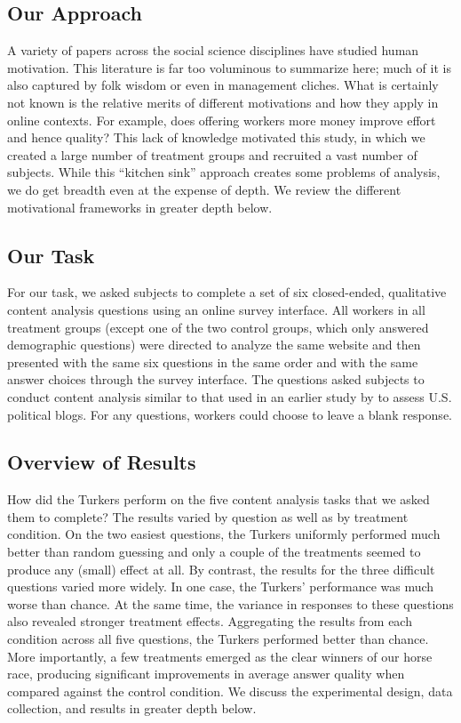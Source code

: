 \documentclass{chi2009}
\begin{document}
\subsection{Our Approach} 
A variety of papers across the social science disciplines have studied
human motivation. This literature is far too voluminous to summarize
here; much of it is also captured by folk wisdom or even in management
cliches. What is certainly not known is the relative merits of
different motivations and how they apply in online contexts. For
example, does offering workers more money improve effort and hence
quality? This lack of knowledge motivated this study, in which we
created a large number of treatment groups and recruited a vast number
of subjects. While this ``kitchen sink'' approach creates some
problems of analysis, we do get breadth even at the expense of
depth. We review the different motivational frameworks in greater
depth below.

\subsection{Our Task} 
For our task, we asked subjects to complete a set of six closed-ended,
qualitative content analysis questions using an online survey
interface. All workers in all treatment groups (except one of the two
control groups, which only answered demographic questions) were
directed to analyze the same website and then presented with the same
six questions in the same order and with the same answer choices
through the survey interface. The questions asked subjects to conduct
content analysis similar to that used in an earlier study by
\cite{benklershaw2010} to assess U.S. political blogs. For any
questions, workers could choose to leave a blank response.


\subsection{Overview of Results} 
How did the Turkers perform on the five content analysis tasks that we
asked them to complete? The results varied by question as well as by
treatment condition. On the two easiest questions, the Turkers
uniformly performed much better than random guessing and only a couple
of the treatments seemed to produce any (small) effect at all. By
contrast, the results for the three difficult questions varied more
widely. In one case, the Turkers' performance was much worse than
chance. At the same time, the variance in responses to these questions
also revealed stronger treatment effects. Aggregating the results from
each condition across all five questions, the Turkers performed better
than chance. More importantly, a few treatments emerged as the clear
winners of our horse race, producing significant improvements in
average answer quality when compared against the control condition. We
discuss the experimental design, data collection, and results in
greater depth below.
\end{document}
